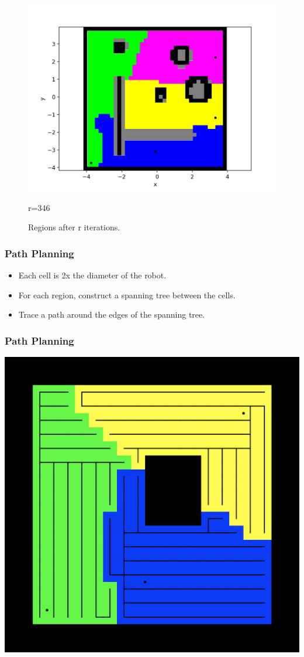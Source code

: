 \documentclass{beamer}
\begin{document}
\begin{frame}
\begin{figure}[H]
\begin{minipage}{0.3\textwidth}
				\includegraphics[width=\linewidth]{DARPImages/346}
				\caption{r=346}
			\end{minipage}
			
			\caption{Regions after r iterations.} \label{fig:4pics}
		\end{figure}
	\end{frame}
	\begin{frame}
		\frametitle{Path Planning}
		\begin{itemize}
			\item<2-> Each cell is 2x the diameter of the robot.
			\item<3-> For each region, construct a spanning tree between the cells.
			\item<4-> Trace a path around the edges of the spanning tree.
		\end{itemize}
	\end{frame}
	\begin{frame}
		\frametitle{Path Planning}
		\centering
		\includegraphics[width=0.7\linewidth]{SpanningTreeExample}
	\end{frame}
\end{document}
